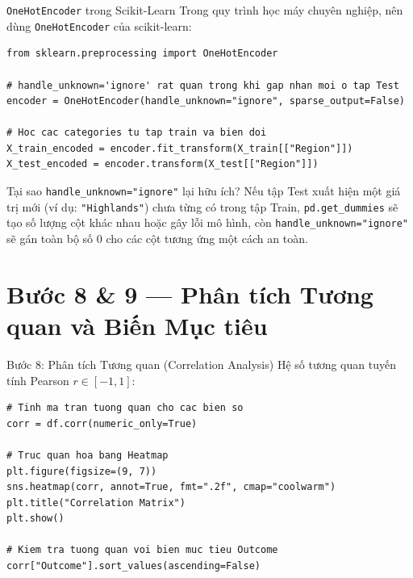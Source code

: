 \documentclass[aspectratio=169,11pt]{beamer}
\newcommand{\code}[1]{\texttt{#1}}
\newcommand{\smallgap}{\vspace{0.35em}}
\begin{document}
\begin{frame}[fragile]{\texttt{OneHotEncoder} trong Scikit-Learn}
Trong quy trình học máy chuyên nghiệp, nên dùng \code{OneHotEncoder} của scikit-learn:

\begin{lstlisting}[style=pythonstyle]
from sklearn.preprocessing import OneHotEncoder

# handle_unknown='ignore' rat quan trong khi gap nhan moi o tap Test
encoder = OneHotEncoder(handle_unknown="ignore", sparse_output=False)

# Hoc cac categories tu tap train va bien doi
X_train_encoded = encoder.fit_transform(X_train[["Region"]])
X_test_encoded = encoder.transform(X_test[["Region"]])
\end{lstlisting}

\smallgap
\begin{block}{Tại sao \texttt{handle\_unknown="ignore"} lại hữu ích?}
Nếu tập Test xuất hiện một giá trị mới (ví dụ: \code{"Highlands"}) chưa từng có trong tập Train, \code{pd.get\_dummies} sẽ tạo số lượng cột khác nhau hoặc gây lỗi mô hình, còn \code{handle\_unknown="ignore"} sẽ gán toàn bộ số 0 cho các cột tương ứng một cách an toàn.
\end{block}
\end{frame}

\section{Bước 8 \& 9 — Phân tích Tương quan và Biến Mục tiêu}

\begin{frame}[fragile]{Bước 8: Phân tích Tương quan (Correlation Analysis)}
Hệ số tương quan tuyến tính Pearson $r \in [-1, 1]$:
\begin{lstlisting}[style=pythonstyle]
# Tinh ma tran tuong quan cho cac bien so
corr = df.corr(numeric_only=True)

# Truc quan hoa bang Heatmap
plt.figure(figsize=(9, 7))
sns.heatmap(corr, annot=True, fmt=".2f", cmap="coolwarm")
plt.title("Correlation Matrix")
plt.show()

# Kiem tra tuong quan voi bien muc tieu Outcome
corr["Outcome"].sort_values(ascending=False)
\end{lstlisting}
\end{frame}
\end{document}
